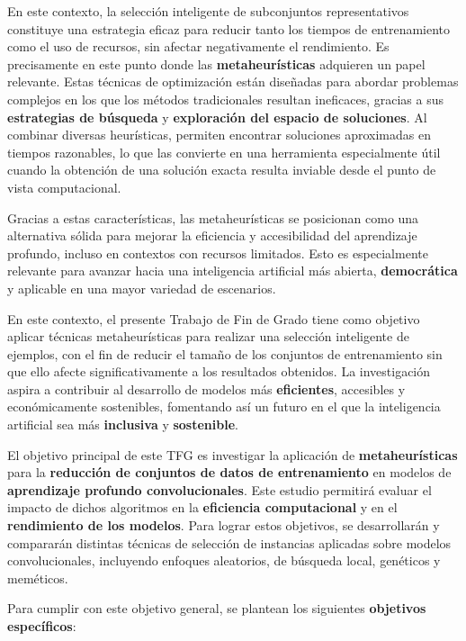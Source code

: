 En este contexto, la selección inteligente de subconjuntos representativos constituye una estrategia eficaz para reducir tanto
los tiempos de entrenamiento como el uso de recursos, sin afectar negativamente el rendimiento.
Es precisamente en este punto donde las \textbf{metaheurísticas} adquieren un papel relevante.
Estas técnicas de optimización están diseñadas para abordar problemas complejos en los que los métodos tradicionales
resultan ineficaces, gracias a sus \textbf{estrategias de búsqueda} y \textbf{exploración del espacio de soluciones}.
Al combinar diversas heurísticas, permiten encontrar soluciones aproximadas en tiempos razonables, lo que las convierte
en una herramienta especialmente útil cuando la obtención de una solución exacta resulta inviable desde el punto de
vista computacional.


Gracias a estas características, las metaheurísticas se posicionan como una alternativa sólida
para mejorar la eficiencia y accesibilidad del aprendizaje profundo, incluso en contextos con recursos limitados.
Esto es especialmente relevante para avanzar hacia una inteligencia artificial más abierta, \textbf{democrática} y aplicable
en una mayor variedad de escenarios.


En este contexto, el presente Trabajo de Fin de Grado tiene como objetivo aplicar técnicas metaheurísticas para realizar una selección
inteligente de ejemplos, con el fin de reducir el tamaño de los conjuntos de entrenamiento sin que ello afecte
significativamente a los resultados obtenidos.
La investigación aspira a contribuir al desarrollo de modelos más \textbf{eficientes}, accesibles y económicamente
sostenibles, fomentando así un futuro en el que la inteligencia artificial sea más \textbf{inclusiva} y
\textbf{sostenible}.


El objetivo principal de este TFG es investigar la aplicación de \textbf{metaheurísticas} para la
\textbf{reducción de conjuntos de datos de entrenamiento} en modelos de \textbf{aprendizaje profundo convolucionales}.
Este estudio permitirá evaluar el impacto de dichos algoritmos en la \textbf{eficiencia computacional} y en el
\textbf{rendimiento de los modelos}.
Para lograr estos objetivos, se desarrollarán y compararán distintas técnicas de selección de instancias aplicadas
sobre modelos convolucionales, incluyendo enfoques aleatorios, de búsqueda local, genéticos y meméticos.


Para cumplir con este objetivo general, se plantean los siguientes \textbf{objetivos específicos}:

